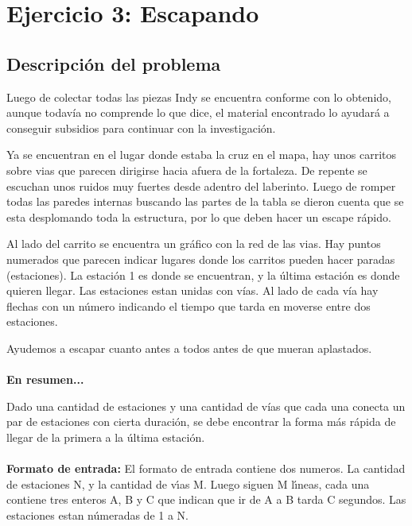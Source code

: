 \section{Ejercicio 3: Escapando}
    \subsection{Descripción del problema}

        \par Luego de colectar todas las piezas Indy se encuentra conforme con lo obtenido, aunque todavía no comprende lo que dice, el material encontrado lo ayudará a conseguir subsidios para continuar con la investigación.
        \par Ya se encuentran en el lugar donde estaba la cruz en el mapa, hay unos carritos sobre vias que parecen dirigirse hacia afuera de la fortaleza. De repente se escuchan unos ruidos muy fuertes desde adentro del laberinto. Luego de romper todas las paredes internas buscando las partes de la tabla se dieron cuenta que se esta desplomando toda la estructura, por lo que deben hacer un escape rápido. \par Al lado del carrito se encuentra un gráfico con la red de las vias. Hay puntos numerados que parecen indicar lugares donde los carritos pueden hacer paradas (estaciones). La estación 1 es donde se encuentran, y la última estación es donde quieren llegar. Las estaciones estan unidas con vías. Al lado de cada vía hay flechas con un número indicando el tiempo que tarda en moverse entre dos estaciones.
        \par Ayudemos a escapar cuanto antes a todos antes de que mueran aplastados.
        \\~\\
        \textbf{En resumen...}
        \par Dado una cantidad de estaciones y una cantidad de vías que cada una conecta un par de estaciones con cierta duración, se debe encontrar la forma más rápida de llegar de la primera a la última estación.
        \\~\\
        \textbf{Formato de entrada:} El formato de entrada contiene dos numeros. La cantidad de estaciones N, y la cantidad de vı́as M. Luego siguen M lı́neas, cada una contiene tres enteros A, B y C que indican que ir de A a B tarda C segundos. Las estaciones estan númeradas de 1 a N.
        
